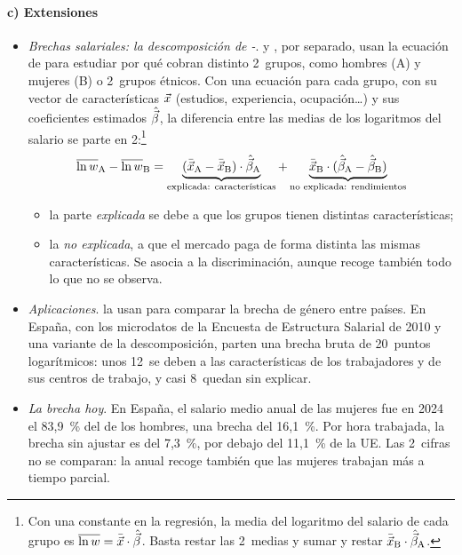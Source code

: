\documentclass[11pt]{article}
\begin{document}
\paragraph{c) Extensiones}\label{sec:mincer-extensiones}

\begin{itemize}
\item \emph{Brechas salariales: la descomposición de -}. \textcite{Oaxaca1973Male} y \textcite{Blinder1973Wage}, por separado, usan la ecuación de  para estudiar por qué cobran distinto 2~grupos, como hombres (A) y mujeres (B) o 2~grupos étnicos. Con una ecuación para cada grupo, con su vector de características $\vec{x}$ (estudios, experiencia, ocupación…) y sus coeficientes estimados $\hat{\vec{\beta}}$, la diferencia entre las medias de los logaritmos del salario se parte en 2:\footnote{Con una constante en la regresión, la media del logaritmo del salario de cada grupo es $\overline{\ln w}=\bar{\vec{x}}\cdot\hat{\vec{\beta}}$. Basta restar las 2~medias y sumar y restar $\bar{\vec{x}}_{\mathrm{B}}\cdot\hat{\vec{\beta}}_{\mathrm{A}}$.}
  \begin{equation}
  \overline{\ln w}_{\mathrm{A}}-\overline{\ln w}_{\mathrm{B}}=\underbrace{(\bar{\vec{x}}_{\mathrm{A}}-\bar{\vec{x}}_{\mathrm{B}})\cdot\hat{\vec{\beta}}_{\mathrm{A}}}_{\text{explicada: características}}+\underbrace{\bar{\vec{x}}_{\mathrm{B}}\cdot(\hat{\vec{\beta}}_{\mathrm{A}}-\hat{\vec{\beta}}_{\mathrm{B}})}_{\text{no explicada: rendimientos}}\label{eq:oaxaca}
  \end{equation}
  \begin{itemize}
  \item la parte \emph{explicada} se debe a que los grupos tienen distintas características;
  \item la \emph{no explicada}, a que el mercado paga de forma distinta las mismas características. Se asocia a la discriminación, aunque recoge también todo lo que no se observa.
  \end{itemize}
\item \emph{Aplicaciones}. \textcite{BlauKahn1992Gender} la usan para comparar la brecha de género entre países. En España, con los microdatos de la Encuesta de Estructura Salarial de 2010 y una variante de la descomposición, \textcite{MurilloRamosSimon2017Regional} parten una brecha bruta de 20~puntos logarítmicos: unos 12~se deben a las características de los trabajadores y de sus centros de trabajo, y casi 8~quedan sin explicar.
\item \emph{La brecha hoy}. En España, el salario medio anual de las mujeres fue en 2024 el 83{,}9~\% del de los hombres, una brecha del 16{,}1~\%\nocite{INE2026EAES2024}. Por hora trabajada, la brecha sin ajustar es del 7{,}3~\%, por debajo del 11{,}1~\% de la UE\nocite{Eurostat2026BrechaSalarial}. Las 2~cifras no se comparan: la anual recoge también que las mujeres trabajan más a tiempo parcial.

\end{itemize}
\end{document}

